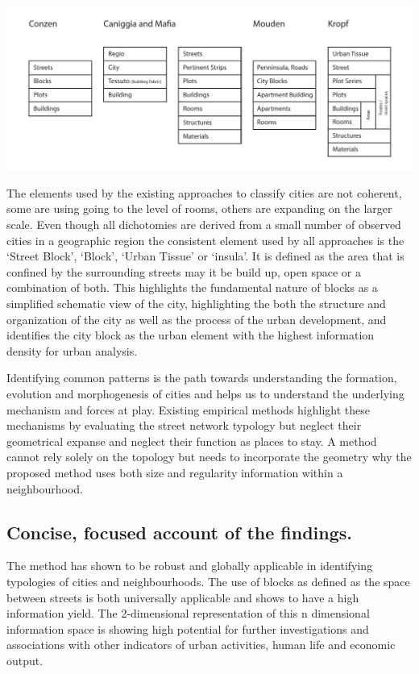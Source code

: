 \documentclass{nature}
\makeatletter
\renewenvironment*{figure}{\@float{figure}}{\end@float}
\makeatother
\begin{document}
\begin{figure}
\centering    
\includegraphics[scale=0.80,page=1]{Images/Typology_Dichtomies.pdf}  
\caption{\bf Different scales of dichotomies. }    
 \label{fig:TypologyDichtomies}  
\end{figure} 

The elements used by the existing approaches to classify cities are not coherent, some are using going to the level of rooms, others are expanding on the larger scale. Even though all dichotomies are derived from a small number of observed cities in a geographic region the consistent element used by all approaches is the `Street Block', `Block', `Urban Tissue' or `insula'. It is defined as the area that is confined by the surrounding streets may it be build up, open space or a combination of both. This highlights the fundamental nature of blocks as a simplified schematic view of the city\cite{Southworth2013}, highlighting the both the structure and organization of the city as well as the process of the urban development, and identifies the city block as the urban element with the highest information density for urban analysis.  

Identifying common patterns is the path towards understanding the formation, evolution and morphogenesis of cities and helps us to understand the underlying mechanism and forces at play. Existing empirical methods highlight these mechanisms by evaluating the street network typology\cite{Hillier1989} but neglect their geometrical expanse and neglect their function as places to stay.  A method cannot rely solely on the topology but needs to incorporate the geometry \cite{Louf2014a} why the proposed method uses both size and regularity information within a neighbourhood.



\subsection{Concise, focused account of the findings.}
The method has shown to be robust and globally applicable in identifying typologies of cities and neighbourhoods. The use of blocks as defined as the space between streets is both universally applicable and shows to have a high information yield. The 2-dimensional representation of this n dimensional information space is showing high potential for further investigations and associations with other indicators of urban activities, human life and economic output.
\end{document}
